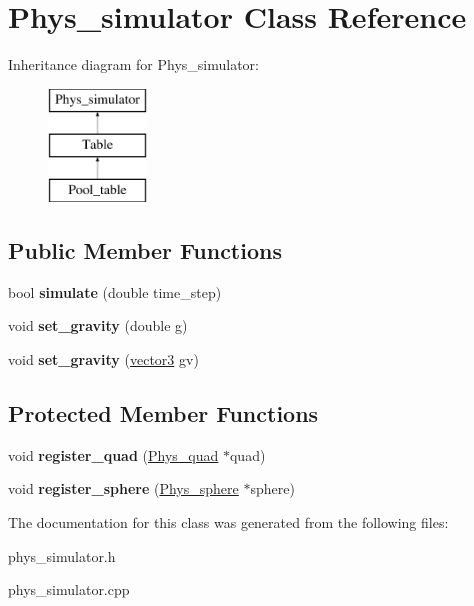 \hypertarget{class_phys__simulator}{
\section{Phys\_\-simulator Class Reference}
\label{class_phys__simulator}
}
Inheritance diagram for Phys\_\-simulator:\begin{figure}[H]
\begin{center}
\leavevmode
\includegraphics[height=3.000000cm]{class_phys__simulator}
\end{center}
\end{figure}
\subsection*{Public Member Functions}
\begin{DoxyCompactItemize}
\item 
\hypertarget{class_phys__simulator_a6d9232054fd50914c3aa5e0efe9d8a9c}{
bool {\bfseries simulate} (double time\_\-step)}
\label{class_phys__simulator_a6d9232054fd50914c3aa5e0efe9d8a9c}

\item 
\hypertarget{class_phys__simulator_a601ee80203c1e9327eae98c194ba4597}{
void {\bfseries set\_\-gravity} (double g)}
\label{class_phys__simulator_a601ee80203c1e9327eae98c194ba4597}

\item 
\hypertarget{class_phys__simulator_a50e5e922331b008bdcf751dfa042facb}{
void {\bfseries set\_\-gravity} (\hyperlink{classvector3d}{vector3} gv)}
\label{class_phys__simulator_a50e5e922331b008bdcf751dfa042facb}

\end{DoxyCompactItemize}
\subsection*{Protected Member Functions}
\begin{DoxyCompactItemize}
\item 
\hypertarget{class_phys__simulator_a9b18d364d7b15ae14351d8e7a9c366bb}{
void {\bfseries register\_\-quad} (\hyperlink{class_phys__quad}{Phys\_\-quad} $\ast$quad)}
\label{class_phys__simulator_a9b18d364d7b15ae14351d8e7a9c366bb}

\item 
\hypertarget{class_phys__simulator_a80fc6033d8e52dc0692aa1c2a382d81b}{
void {\bfseries register\_\-sphere} (\hyperlink{class_phys__sphere}{Phys\_\-sphere} $\ast$sphere)}
\label{class_phys__simulator_a80fc6033d8e52dc0692aa1c2a382d81b}

\end{DoxyCompactItemize}


The documentation for this class was generated from the following files:\begin{DoxyCompactItemize}
\item 
phys\_\-simulator.h\item 
phys\_\-simulator.cpp\end{DoxyCompactItemize}
